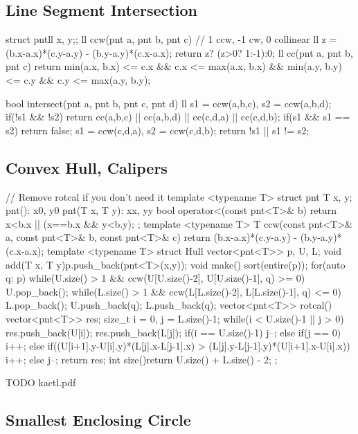 \subsection{Line Segment Intersection}
\begin{cpp}
struct pnt{ll x, y;};
ll ccw(pnt a, pnt b, pnt c){
  // 1 ccw, -1 cw, 0 collinear
  ll z = (b.x-a.x)*(c.y-a.y) - (b.y-a.y)*(c.x-a.x);
  return z? (z>0? 1:-1):0;
}
ll cc(pnt a, pnt b, pnt c){
  return min(a.x, b.x) <= c.x && c.x <= max(a.x, b.x) &&
    min(a.y, b.y) <= c.y && c.y <= max(a.y, b.y);
}

bool intersect(pnt a, pnt b, pnt c, pnt d){
  ll s1 = ccw(a,b,c), s2 = ccw(a,b,d);
  if(!s1 && !s2)
    return cc(a,b,c) || cc(a,b,d) ||
           cc(c,d,a) || cc(c,d,b);
  if(s1 && s1 == s2) return false;
  s1 = ccw(c,d,a), s2 = ccw(c,d,b);
  return !s1 || s1 != s2;
}
\end{cpp}

\subsection{Convex Hull, Calipers}
\begin{cpp}
// Remove rotcal if you don't need it
template <typename T>
struct pnt{
  T x, y;
  pnt(): x{0}, y{0} {}
  pnt(T x, T y): x{x}, y{y} {}
  bool operator<(const pnt<T>& b)
    {return x<b.x || (x==b.x && y<b.y);}
};
template <typename T>
T ccw(const pnt<T>& a, const pnt<T>& b, const pnt<T>& c){
  return (b.x-a.x)*(c.y-a.y) - (b.y-a.y)*(c.x-a.x);
}
template <typename T>
struct Hull{
  vector<pnt<T>> p, U, L;
  void add(T x, T y){p.push_back(pnt<T>(x,y));}
  void make(){
    sort(entire(p));
    for(auto q: p){
      while(U.size() > 1 && ccw(U[U.size()-2],
        U[U.size()-1], q) >= 0) U.pop_back();
      while(L.size() > 1 && ccw(L[L.size()-2],
        L[L.size()-1], q) <= 0) L.pop_back();
      U.push_back(q); L.push_back(q);
    }
  }
  vector<pnt<T>> rotcal(){
    vector<pnt<T>> res;
    size_t i = 0, j = L.size()-1;
    while(i < U.size()-1 || j > 0){
      res.push_back(U[i]);
      res.push_back(L[j]);
      if(i == U.size()-1) j--;
      else if(j == 0) i++;
      else if((U[i+1].y-U[i].y)*(L[j].x-L[j-1].x) > 
        (L[j].y-L[j-1].y)*(U[i+1].x-U[i].x)) i++;
      else j--;
    }
    return res;
  }
  int size(){return U.size() + L.size() - 2;}
};
\end{cpp}

TODO kactl.pdf

\subsection{Smallest Enclosing Circle}

